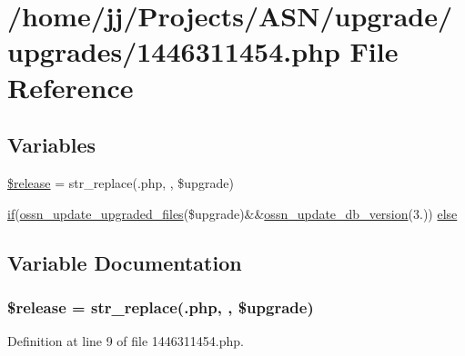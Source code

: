 \hypertarget{1446311454_8php}{}\section{/home/jj/\+Projects/\+A\+S\+N/upgrade/upgrades/1446311454.php File Reference}
\label{1446311454_8php}
\subsection*{Variables}
\begin{DoxyCompactItemize}
\item 
\hyperlink{1446311454_8php_a63c5d6a8a9f1768ea926cee666dc991b}{\$release} = str\+\_\+replace(\textquotesingle{}.php\textquotesingle{}, \textquotesingle{}\textquotesingle{}, \$upgrade)
\item 
\hyperlink{jquery_8tokeninput_8js_ad8dd46a3cbc004569e34401e9e71771a}{if}(\hyperlink{ossn_8lib_8upgrade_8php_af5e235e44fa65a589d768b2693399250}{ossn\+\_\+update\+\_\+upgraded\+\_\+files}(\$upgrade)\&\&\hyperlink{ossn_8lib_8upgrade_8php_aa7120e10a9c14b722b0e25c99bc86d92}{ossn\+\_\+update\+\_\+db\+\_\+version}(\textquotesingle{}3.\textquotesingle{})) \hyperlink{1446311454_8php_a06a1117582f3e8cc425444c3ab078582}{else}
\end{DoxyCompactItemize}


\subsection{Variable Documentation}
\subsubsection[{\texorpdfstring{\$release}{$release}}]{\setlength{\rightskip}{0pt plus 5cm}\$release = str\+\_\+replace(\textquotesingle{}.php\textquotesingle{}, \textquotesingle{}\textquotesingle{}, \$upgrade)}\hypertarget{1446311454_8php_a63c5d6a8a9f1768ea926cee666dc991b}{}\label{1446311454_8php_a63c5d6a8a9f1768ea926cee666dc991b}


Definition at line 9 of file 1446311454.\+php.

